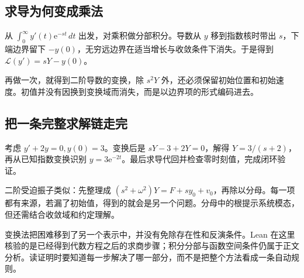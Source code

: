 \subsection*{求导为何变成乘法}
从 $\int_0^\infty y'(t)\mathrm e^{-st}\,dt$ 出发，对乘积做分部积分。导数从 $y$ 移到指数核时带出 $s$，下端边界留下 $-y(0)$，无穷远边界在适当增长与收敛条件下消失。于是得到 $\mathcal L(y')=sY-y(0)$。

再做一次，就得到二阶导数的变换，除 $s^2Y$ 外，还必须保留初始位置和初始速度。初值并没有因换到变换域而消失，而是以边界项的形式编码进去。

\subsection*{把一条完整求解链走完}
考虑 $y'+2y=0,y(0)=3$。变换后是 $sY-3+2Y=0$，解得 $Y=3/(s+2)$，再从已知指数变换识别 $y=3\mathrm e^{-2t}$。最后求导代回并检查零时刻值，完成闭环验证。

二阶受迫振子类似：先整理成 $(s^2+\omega^2)Y=F+sy_0+v_0$，再除以分母。每一项都有来源，若漏了初始值，得到的就会是另一个问题。分母中的根提示系统模态，但还需结合收敛域和约定理解。

变换法把困难移到了另一个表示中，并没有免除存在性和反演条件。Lean 在这里核验的是已经得到代数方程之后的求商步骤；积分分部与函数空间条件仍属于正文分析。读证明时要知道每一步解决了哪一部分，而不是把整个方法看成一条自动规则。
